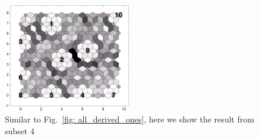 \begin{figure}
        \centering
         \includegraphics[width=0.5\textwidth]{../../images0.01/M31/2D/image_subsets/subset2_dist_with_hits_t.png}
    \caption{Similar to Fig.~\ref{fig: all_derived_ones}, here we show the result from subset 4}
    \label{fig: subset2}
\end{figure}